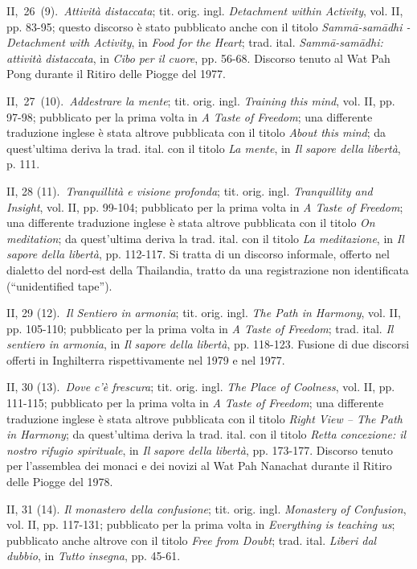 II,~26~(9).~\emph{Attività distaccata}; tit. orig. ingl.
\emph{Detachment within Activity}, vol. II, pp. 83-95; questo discorso è
stato pubblicato anche con il titolo \emph{Sammā-samādhi - Detachment
with Activity}, in \emph{Food} \emph{for the Heart}; trad. ital.
\emph{Sammā-samādhi: attività distaccata}, in \emph{Cibo per il cuore},
pp. 56-68. Discorso tenuto al Wat Pah Pong durante il Ritiro delle
Piogge del 1977.

II,~27~(10).~\emph{Addestrare la mente}; tit. orig. ingl. \emph{Training
this mind}, vol. II, pp. 97-98; pubblicato per la prima volta in \emph{A
Taste of Freedom}; una differente traduzione inglese è stata altrove
pubblicata con il titolo \emph{About this mind}; da quest'ultima deriva
la trad. ital. con il titolo \emph{La mente}, in \emph{Il} \emph{sapore
della libertà}, p. 111.

II, 28 (11).~\emph{Tranquillità e visione profonda}; tit. orig. ingl.
\emph{Tranquillity and Insight}, vol. II, pp. 99-104; pubblicato per la
prima volta in \emph{A Taste of Freedom}; una differente traduzione
inglese è stata altrove pubblicata con il titolo \emph{On meditation};
da quest'ultima deriva la trad. ital. con il titolo \emph{La
meditazione}, in \emph{Il} \emph{sapore della libertà}, pp. 112-117. Si
tratta di un discorso informale, offerto nel dialetto del nord-est della
Thailandia, tratto da una registrazione non identificata (``unidentified
tape'').

II, 29 (12).~\emph{Il Sentiero in armonia}; tit. orig. ingl. \emph{The
Path in Harmony}, vol. II, pp. 105-110; pubblicato per la prima volta in
\emph{A Taste of Freedom}; trad. ital. \emph{Il sentiero in armonia}, in
\emph{Il} \emph{sapore della libertà}, pp. 118-123. Fusione di due
discorsi offerti in Inghilterra rispettivamente nel 1979 e nel 1977.

II, 30 (13).~\emph{Dove c'è frescura}; tit. orig. ingl. \emph{The Place
of Coolness}, vol. II, pp. 111-115; pubblicato per la prima volta in
\emph{A Taste of Freedom}; una differente traduzione inglese è stata
altrove pubblicata con il titolo \emph{Right View -- The Path in
Harmony}; da quest'ultima deriva la trad. ital. con il titolo
\emph{Retta concezione: il nostro rifugio spirituale}, in \emph{Il}
\emph{sapore della libertà}, pp. 173-177. Discorso tenuto per
l'assemblea dei monaci e dei novizi al Wat Pah Nanachat durante il
Ritiro delle Piogge del 1978.

II, 31 (14). \emph{Il monastero della confusione}; tit. orig. ingl.
\emph{Monastery of Confusion}, vol. II, pp. 117-131; pubblicato per la
prima volta in \emph{Everything is teaching us}; pubblicato anche
altrove con il titolo \emph{Free from Doubt}; trad. ital. \emph{Liberi
dal dubbio}, in \emph{Tutto insegna}, pp. 45-61.

